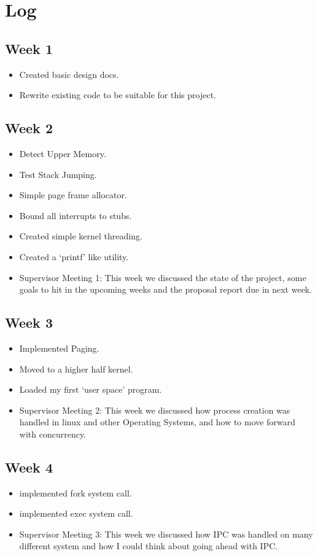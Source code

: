 \documentclass[a4paper]{report}
\begin{document}
\chapter{Log}


\section{Week 1}
\begin{itemize}
\item Created basic design docs.
\item Rewrite existing code to be suitable for this project.
\end{itemize}

\section{Week 2}
\begin{itemize}
\item Detect Upper Memory.
\item Test Stack Jumping.
\item Simple page frame allocator.
\item Bound all interrupts to stubs.
\item Created simple kernel threading.
\item Created a `printf' like utility.
\item Supervisor Meeting 1: This week we discussed the state of the project, some goals to hit in the upcoming weeks and the proposal report due in next week.
\end{itemize}

\section{Week 3}
\begin{itemize}
\item Implemented Paging.
\item Moved to a higher half kernel.
\item Loaded my first `user space' program.
\item Supervisor Meeting 2: This week we discussed how process creation was handled in linux and other Operating Systems, and how to move forward with concurrency.
\end{itemize}

\section{Week 4}
\begin{itemize}
\item implemented fork system call.
\item implemented exec system call.
\item Supervisor Meeting 3: This week we discussed how IPC was handled on many different system and how I could think about going ahead with IPC.
\end{itemize}
\end{document}
